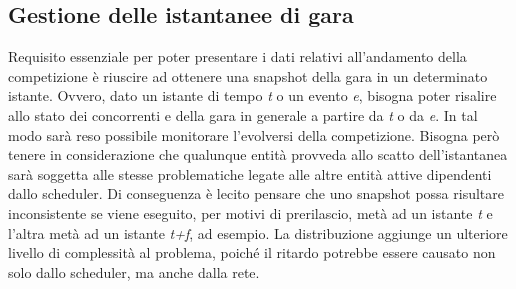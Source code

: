 \subsection{Gestione delle istantanee di gara}
\label{enunciazione_istantanee}
Requisito essenziale per poter presentare i dati relativi all'andamento della
competizione è riuscire ad ottenere una
snapshot della gara in un determinato istante. Ovvero, dato un istante di tempo
\emph{t} o un evento \emph{e}, bisogna
poter risalire allo stato dei concorrenti e della gara in generale a partire da \emph{t} o da \emph{e}. 
In tal modo sarà reso possibile
monitorare l'evolversi della competizione. Bisogna però tenere in considerazione
che qualunque entità provveda allo scatto
dell'istantanea sarà soggetta alle stesse problematiche legate alle altre entità
attive dipendenti dallo scheduler. 
Di conseguenza è lecito pensare che uno snapshot possa risultare inconsistente
se viene eseguito, per motivi di 
prerilascio, metà ad un istante
\emph{t} e l'altra metà ad un istante \emph{t+f}, ad esempio. La distribuzione
aggiunge un ulteriore livello di complessità
al problema, poiché il ritardo potrebbe essere causato non solo dallo scheduler,
ma anche dalla rete.
